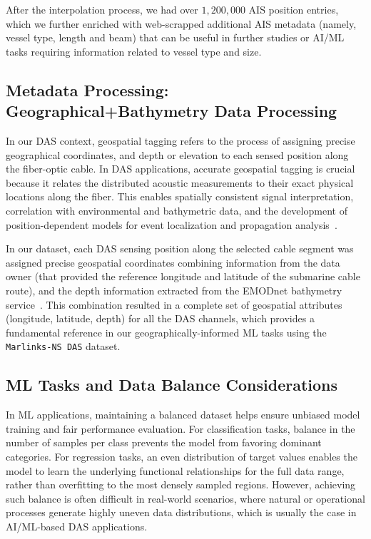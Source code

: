 \documentclass[11pt]{article}
\begin{document}
After the interpolation process, we had over $1,200,000$ AIS position entries, which we further enriched with web-scrapped additional AIS metadata (namely, vessel type, length and beam) that can be useful in further studies or AI/ML tasks requiring information related to vessel type and size.


\subsection{Metadata Processing: Geographical+Bathymetry Data Processing}
\label{sec:geospatial-tagging}

In our DAS context, geospatial tagging refers to the process of assigning precise geographical coordinates, and depth or elevation to each sensed position along the fiber-optic cable. In DAS applications, accurate geospatial tagging is crucial because it relates the distributed acoustic measurements to their exact physical locations along the fiber. This enables spatially consistent signal interpretation, correlation with environmental and bathymetric data, and the development of position-dependent models for event localization and propagation analysis~\cite{holman2025}.

In our dataset, each DAS sensing position along the selected cable segment was assigned precise geospatial coordinates combining information from the data owner (that provided the reference longitude and latitude of the submarine cable route), and the depth information extracted from the EMODnet bathymetry service~\cite{emodnet2024}. This combination resulted in a complete set of geospatial attributes (longitude, latitude, depth) for all the DAS channels, which provides a fundamental reference in our geographically-informed ML tasks using the \texttt{Marlinks‐NS DAS} dataset.


\subsection{ML Tasks and Data Balance Considerations}
\label{sec:ml-tasks}

In ML applications, maintaining a balanced dataset helps ensure unbiased model training and fair performance evaluation. For classification tasks, balance in the number of samples per class prevents the model from favoring dominant categories. For regression tasks, an even distribution of target values enables the model to learn the underlying functional relationships for the full data range, rather than overfitting to the most densely sampled regions. However, achieving such balance is often difficult in real-world scenarios, where natural or operational processes generate highly uneven data distributions, which is usually the case in AI/ML-based DAS applications.
\end{document}
